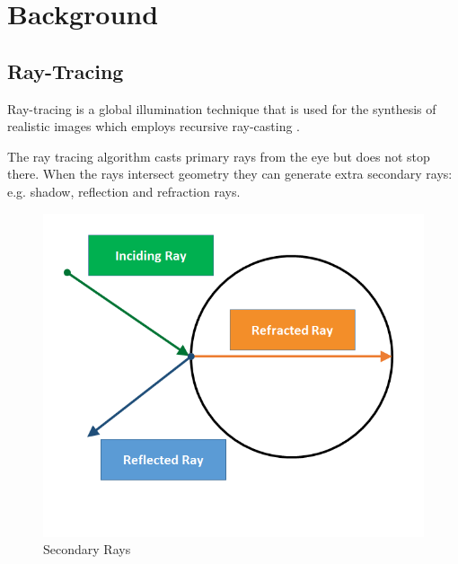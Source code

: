 
\chapter{Background}
\label{chapter:background}

\section{Ray-Tracing}
\label{section:background_ray_tracing}

Ray-tracing \cite{Whitted80} is a global illumination \cite{Ritschel12} technique that is used for the synthesis of realistic images which employs recursive ray-casting \cite{Appel68}.

\medskip

The ray tracing algorithm casts primary rays from the eye but does not stop there. 
When the rays intersect geometry they can generate extra secondary rays: e.g. shadow, reflection and refraction rays.

\begin{figure}[!htb]
    \centering
    \includegraphics[scale=0.65]{Images/Secondary_Rays}
    \caption{\label{fig:bscr}Secondary Rays}
\end{figure}

